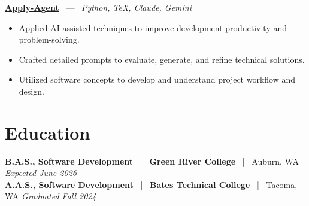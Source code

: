 \documentclass[10pt, letterpaper]{article}
\newcommand{\jobhead}[4]{%
  \vspace{5pt}%
  {\bfseries\color{dark}#1}%
  ~{\color{light}|}~%
  {\bfseries\color{navy}#2}%
  ~{\color{light}|}~%
  {\color{light}#3}%
  \hfill{\color{light}\small\textit{#4}}\\[-2pt]%
}
\newcommand{\projhead}[3]{%
  \vspace{5pt}%
  {\bfseries\color{dark}\href{#2}{#1}}%
  ~{\color{light}---}~%
  {\color{light}\small\textit{#3}}\\[-2pt]%
}
\begin{document}
\projhead{Apply-Agent}{https://github.com/timmyd4/apply-agent}{Python, TeX, Claude, Gemini}
\begin{itemize}
  \item Applied AI-assisted techniques to improve development productivity and problem-solving.
  \item Crafted detailed prompts to evaluate, generate, and refine technical solutions.
  \item Utilized software concepts to develop and understand project workflow and design.
\end{itemize}

\section{Education}

\jobhead{B.A.S., Software Development}{Green River College}{Auburn, WA}{Expected June 2026}
\jobhead{A.A.S., Software Development}{Bates Technical College}{Tacoma, WA}{Graduated Fall 2024}
\end{document}
